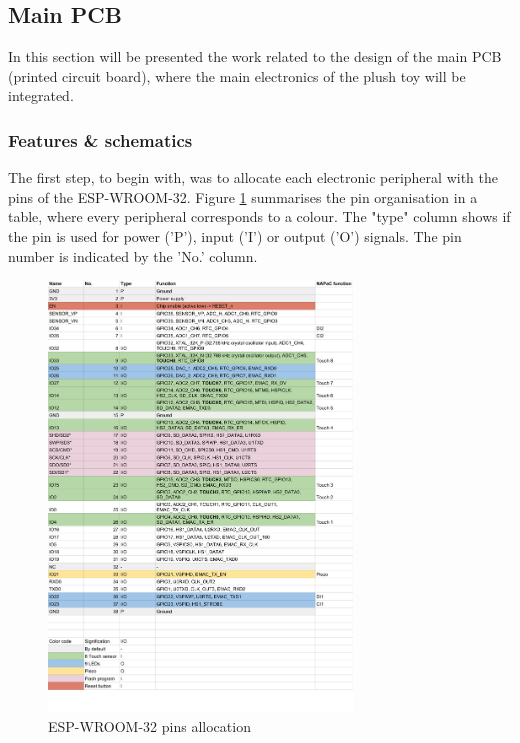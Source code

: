 \newpage
\subsection{Main PCB}
\label{subsec:main_pcb} 

In this section will be presented the work related to the design of the main PCB (printed circuit board), where the main electronics of the plush toy will be integrated.

\subsubsection{Features \& schematics}
\label{subsubsec:main_pcb/features&schematics} 

The first step, to begin with, was to allocate each electronic peripheral with the pins of the ESP-WROOM-32. Figure \ref{fig:pins_allocation} summarises the pin organisation in a table, where every peripheral corresponds to a colour. The "type" column shows if the pin is used for power ('P'), input ('I') or output ('O') signals. The pin number is indicated by the 'No.' column.

\begin{figure}[H]
    \centering
    \includegraphics[width=0.72\textwidth]{images/EE_PinsallocationESPWROOM32-Sheet1.pdf}
    \caption{ESP-WROOM-32 pins allocation}
    \label{fig:pins_allocation}
\end{figure}

